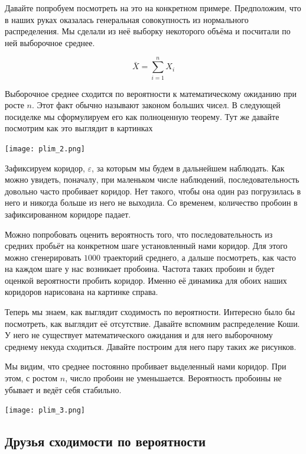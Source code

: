 \documentclass[12pt, a4paper, oneside]{article}
\begin{document}
Давайте попробуем посмотреть на это на конкретном примере. Предположим, что в наших руках оказалась генеральная совокупность из нормального распределения. Мы сделали из неё выборку некоторого объёма и посчитали по ней выборочное среднее. 

$$
\bar X = \sum_{i=1}^n X_i
$$

Выборочное среднее сходится по вероятности к математическому ожиданию при росте  $n$. Этот факт обычно называют законом больших чисел. В следующей посиделке мы сформулируем его как полноценную теорему. Тут же давайте посмотрим как это выглядит в картинках

\begin{center} 
\texttt{[image: plim\_2.png]}
\end{center} 

Зафиксируем коридор, $\varepsilon$, за которым мы будем в дальнейшем наблюдать. Как можно увидеть, поначалу, при маленьком числе наблюдений, последовательность довольно часто пробивает коридор. Нет такого, чтобы она один раз погрузилась в него и никогда больше из него не выходила. Со временем, количество пробоин в зафиксированном коридоре падает.

Можно попробовать оценить вероятность того, что последовательность из средних пробьёт на конкретном шаге установленный нами коридор. Для этого можно сгенерировать $1000$ траекторий среднего, а дальше посмотреть, как часто на каждом шаге у нас возникает пробоина. Частота таких пробоин и будет оценкой вероятности пробить коридор. Именно её динамика для обоих наших коридоров нарисована на картинке справа. 

Теперь мы знаем, как выглядит сходимость по вероятности. Интересно было бы посмотреть, как выглядит её отсутствие. Давайте вспомним распределение Коши. У него не существует математического ожидания и для него выборочному среднему некуда сходиться. Давайте построим для него пару таких же рисунков. 

Мы видим, что среднее постоянно пробивает выделенный нами коридор. При этом, с ростом $n$, число пробоин не уменьшается. Вероятность пробоины не убывает и ведёт себя стабильно. 

\begin{center} 
\texttt{[image: plim\_3.png]}
\end{center} 


\subsection{Друзья сходимости по вероятности}
\end{document}
